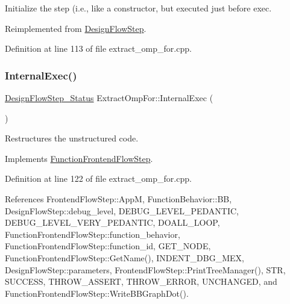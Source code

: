 Initialize the step (i.\+e., like a constructor, but executed just before exec. 



Reimplemented from \hyperlink{classDesignFlowStep_a44b50683382a094976e1d432a7784799}{Design\+Flow\+Step}.



Definition at line 113 of file extract\+\_\+omp\+\_\+for.\+cpp.

\mbox{\label{classExtractOmpFor_aedb821b92ea3f6554fc10e661377d059}} 
\subsubsection{\texorpdfstring{Internal\+Exec()}{InternalExec()}}
{\footnotesize\ttfamily \hyperlink{design__flow__step_8hpp_afb1f0d73069c26076b8d31dbc8ebecdf}{Design\+Flow\+Step\+\_\+\+Status} Extract\+Omp\+For\+::\+Internal\+Exec (\begin{DoxyParamCaption}{ }\end{DoxyParamCaption})\hspace{0.3cm}{\ttfamily [virtual]}}



Restructures the unstructured code. 



Implements \hyperlink{classFunctionFrontendFlowStep_a00612f7fb9eabbbc8ee7e39d34e5ac68}{Function\+Frontend\+Flow\+Step}.



Definition at line 122 of file extract\+\_\+omp\+\_\+for.\+cpp.



References Frontend\+Flow\+Step\+::\+AppM, Function\+Behavior\+::\+BB, Design\+Flow\+Step\+::debug\+\_\+level, D\+E\+B\+U\+G\+\_\+\+L\+E\+V\+E\+L\+\_\+\+P\+E\+D\+A\+N\+T\+IC, D\+E\+B\+U\+G\+\_\+\+L\+E\+V\+E\+L\+\_\+\+V\+E\+R\+Y\+\_\+\+P\+E\+D\+A\+N\+T\+IC, D\+O\+A\+L\+L\+\_\+\+L\+O\+OP, Function\+Frontend\+Flow\+Step\+::function\+\_\+behavior, Function\+Frontend\+Flow\+Step\+::function\+\_\+id, G\+E\+T\+\_\+\+N\+O\+DE, Function\+Frontend\+Flow\+Step\+::\+Get\+Name(), I\+N\+D\+E\+N\+T\+\_\+\+D\+B\+G\+\_\+\+M\+EX, Design\+Flow\+Step\+::parameters, Frontend\+Flow\+Step\+::\+Print\+Tree\+Manager(), S\+TR, S\+U\+C\+C\+E\+SS, T\+H\+R\+O\+W\+\_\+\+A\+S\+S\+E\+RT, T\+H\+R\+O\+W\+\_\+\+E\+R\+R\+OR, U\+N\+C\+H\+A\+N\+G\+ED, and Function\+Frontend\+Flow\+Step\+::\+Write\+B\+B\+Graph\+Dot().

